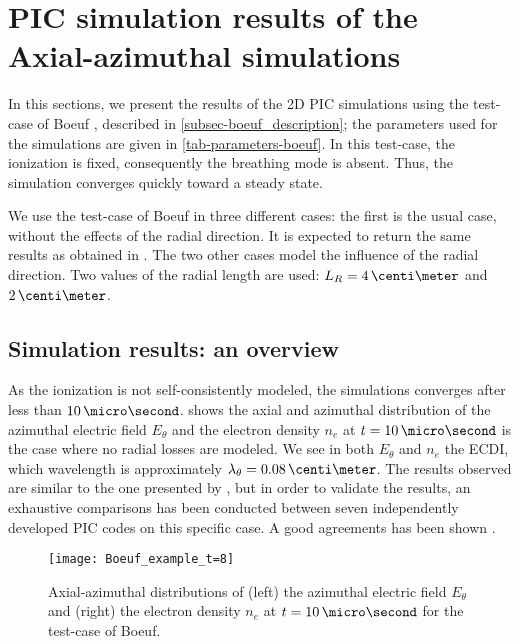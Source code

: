 
\section{PIC simulation results of the Axial-azimuthal simulations}
  \label{sec-Zthetaresults}
  In this sections, we present the results of the \ac{2D} \ac{PIC} simulations using the test-case of Boeuf \citep{boeuf2018}, described in \cref{subsec-boeuf_description}\string; the parameters used for the simulations are given in \vref{tab-parameters-boeuf}.
  In this test-case, the ionization is fixed, consequently the breathing mode is absent.
  Thus, the simulation converges quickly toward a steady state.
  
  We use the test-case of Boeuf in three different cases\string:
  the first is the usual case, without the effects of the radial direction.
  It is expected to return the same results as obtained in \citet{boeuf2018}.
  The two other cases model the influence of the radial direction.
  Two values of the radial length are used\string: $L_R=4\,\centi\meter$ and $2\,\centi\meter$.

  
  \subsection{Simulation results\string: an overview} \label{subsec-boeuf-overview}
    As the ionization is not self-consistently modeled, the simulations converges after less than $10\,\micro\second$.
     shows the axial and azimuthal distribution of the azimuthal electric field $E_{\theta}$ and the electron density $n_e$ at $t=10\,\micro\second$ is the case where no radial losses are modeled.
    We see in both $E_{\theta}$ and $n_e$ the \ac{ECDI}, which wavelength is approximately $\lambda_{\theta} = 0.08\,\centi\meter$.
    The results observed are similar to the one presented by \citet{boeuf2018}, but in order to validate the results, an exhaustive comparisons has been conducted between seven independently developed \ac{PIC} codes on this specific case.
    A good agreements has been shown \citep{charoy2019}.

    \begin{figure}[hbt]
      \centering
      \texttt{[image: Boeuf\_example\_t=8]}
      \caption{ Axial-azimuthal distributions of (left) the azimuthal electric field $E_{\theta}$ and (right) the electron density $n_e$ at $t=10\,\micro\second$ for the test-case of Boeuf. } 
      \label{fig-overview_boeuf_neEx}
    \end{figure}

